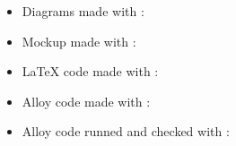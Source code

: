 \begin{itemize}
    \item Diagrams made with :
    \item Mockup made with :
    \item LaTeX code made with :
    \item Alloy code made with :
    \item Alloy code runned and checked with :
\end{itemize}